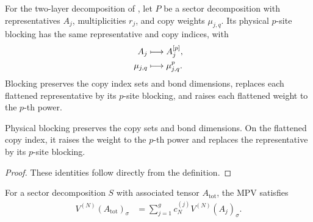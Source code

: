 \begin{definition}%
    \label{def:sector_decomposition_block_tensor}
    \leanok
    For the two-layer decomposition of \cite[lines~283--301]{Cirac2016MPDO_arXiv},
    let $P$ be a sector decomposition with representatives $A_j$,
    multiplicities $r_j$, and copy weights $\mu_{j,q}$. Its physical
    $p$-site blocking has the same representative and copy indices, with
    \begin{align}
        A_j       & \longmapsto A_j^{[p]},
        \notag                                 \\
        \mu_{j,q} & \longmapsto \mu_{j,q}^{p}.
        \notag
    \end{align}
    Blocking preserves the copy index sets and bond dimensions, replaces each
    flattened representative by its $p$-site blocking, and raises each
    flattened weight to the $p$-th power.
\end{definition}

\begin{lemma}%
    \label{thm:sector_decomposition_block_tensor_data}
    \leanok
    Physical blocking preserves the copy sets and bond dimensions. On the
    flattened copy index, it raises the weight to the $p$-th power and replaces
    the representative by its $p$-site blocking.
\end{lemma}

\begin{proof}\leanok
    These identities follow directly from the definition.
\end{proof}

\begin{lemma}%
    \label{lem:paper_decomp_formula}
    \leanok
    For a sector decomposition $S$ with associated tensor $A_{\mathrm{tot}}$,
    the MPV satisfies
    \begin{align}
        V^{(N)}(A_{\mathrm{tot}})_\sigma
         & =
        \sum_{j=1}^{g} c_N^{(j)} V^{(N)}(A_j)_\sigma.
        \label{eq:bnt_sector_decomp}
    \end{align}
\end{lemma}

